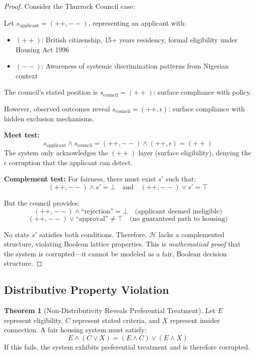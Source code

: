 \documentclass[11pt,a4paper]{article}
\theoremstyle{definition}
\newtheorem{theorem}{Theorem}
\begin{document}
\begin{proof}
Consider the Thurrock Council case:

Let $s_{\text{applicant}} = (++,--)$, representing an applicant with:
\begin{itemize}
    \item $(++)$: British citizenship, 15+ years residency, formal eligibility under Housing Act 1996
    \item $(--)$: Awareness of systemic discrimination patterns from Nigerian context
\end{itemize}

The council's stated position is $s_{\text{council}} = (++)$: surface compliance with policy.

However, observed outcomes reveal $s_{\text{council}} = (++,\epsilon)$: surface compliance with hidden exclusion mechanisms.

\textbf{Meet test:}
\[
s_{\text{applicant}} \wedge s_{\text{council}} = (++,--) \wedge (++,\epsilon) = (++)
\]
The system only acknowledges the $(++)$ layer (surface eligibility), denying the $\epsilon$ corruption that the applicant can detect.

\textbf{Complement test:}
For fairness, there must exist $s'$ such that:
\[
(++,--) \wedge s' = \bot \quad \text{and} \quad (++,--) \vee s' = \top
\]

But the council provides:
\[
(++,--) \wedge \text{``rejection''} = \bot \quad \text{(applicant deemed ineligible)}
\]
\[
(++,--) \vee \text{``approval''} \neq \top \quad \text{(no guaranteed path to housing)}
\]

No state $s'$ satisfies both conditions. Therefore, $\mathcal{H}$ lacks a complemented structure, violating Boolean lattice properties. This is \emph{mathematical proof} that the system is corrupted—it cannot be modeled as a fair, Boolean decision structure.
\end{proof}

\subsection{Distributive Property Violation}

\begin{theorem}[Non-Distributivity Reveals Preferential Treatment]
Let $E$ represent eligibility, $C$ represent stated criteria, and $X$ represent insider connection. A fair housing system must satisfy:
\[
E \wedge (C \vee X) = (E \wedge C) \vee (E \wedge X)
\]
If this fails, the system exhibits preferential treatment and is therefore corrupted.
\end{theorem}
\end{document}
